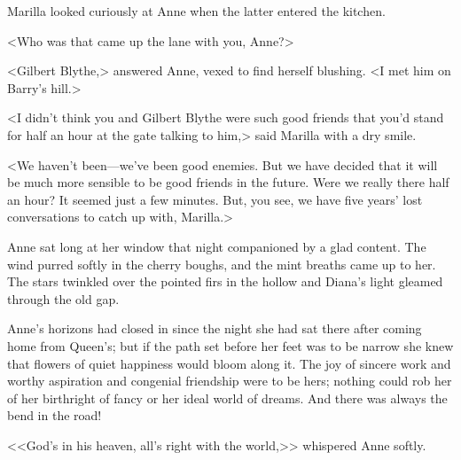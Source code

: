 Marilla looked curiously at Anne when the latter entered the kitchen.

<Who was that came up the lane with you, Anne?>

<Gilbert Blythe,> answered Anne, vexed to find herself blushing. <I met him on Barry's hill.>

<I didn't think you and Gilbert Blythe were such good friends that you'd stand for half an hour at the gate talking to him,> said Marilla with a dry smile.

<We haven't been—we've been good enemies. But we have decided that it will be much more sensible to be good friends in the future. Were we really there half an hour? It seemed just a few minutes. But, you see, we have five years' lost conversations to catch up with, Marilla.>

Anne sat long at her window that night companioned by a glad content. The wind purred softly in the cherry boughs, and the mint breaths came up to her. The stars twinkled over the pointed firs in the hollow and Diana's light gleamed through the old gap.

Anne's horizons had closed in since the night she had sat there after coming home from Queen's; but if the path set before her feet was to be narrow she knew that flowers of quiet happiness would bloom along it. The joy of sincere work and worthy aspiration and congenial friendship were to be hers; nothing could rob her of her birthright of fancy or her ideal world of dreams. And there was always the bend in the road!

<<God's in his heaven, all's right with the world,>> whispered Anne softly.
